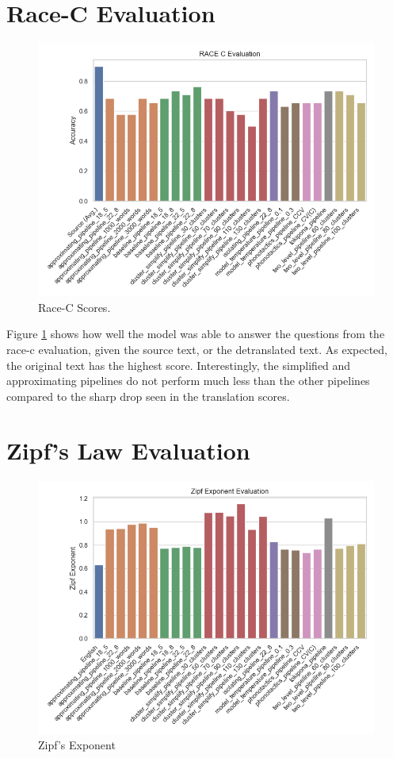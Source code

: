 \section{Race-C Evaluation}
\begin{figure}[H]  
    \centering
    \includegraphics[width=0.7\linewidth]{figures/results/race_c_evaluations.png}
    \caption{Race-C Scores.}
    \label{fig:race-c-scores}
\end{figure}

Figure \ref{fig:race-c-scores} shows how well the model was able to answer the questions from the race-c evaluation, given the source text, or the detranslated
text. As expected, the original text has the highest score. Interestingly, the simplified and approximating pipelines do not perform much less 
than the other pipelines compared to the sharp drop seen in the translation scores.

\section{Zipf's Law Evaluation}
\begin{figure}[H]  
    \centering
    \includegraphics[width=0.7\linewidth]{figures/results/zipfs_law_evaluations.png}
    \caption{Zipf's Exponent}
    \label{fig:zipfs-law-scores}
\end{figure}

